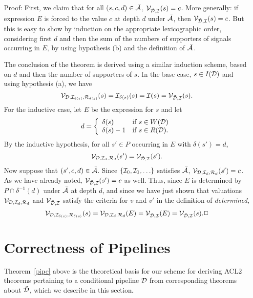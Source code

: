\documentclass{article}
\begin{document}
Proof: First, we claim that for all $(s,c,d) \in \bar{\cal A}$, ${\cal
V}_{\tilde{\cal D},{\cal I}}(s) = c$.  More generally: if expression
$E$ is forced to the value $c$ at depth $d$ under $\bar{\cal A}$, then
${\cal V}_{\tilde{\cal D},{\cal I}}(s) = c$.  But this is easy to show
by induction on the appropriate lexicographic order, considering first
$d$ and then the sum of the numbers of supporters of signals occurring
in $E$, by using hypothesis (b) and the definition of $\bar{\cal A}$.

The conclusion of the theorem is derived using a similar induction
scheme, based on $d$ and then the number of supporters of $s$.  In the
base case, $s \in I({\cal D})$ and using hypothesis (a), we have
\[{\cal V}_{{\cal D},{\cal I}_{\delta(s)},{\cal R}_{\delta(s)}}(s)
= {\cal I}_{\delta(s)}(s)
= {\cal I}(s)
= {\cal V}_{\tilde{\cal D},{\cal I}}(s).\]
For the inductive case, let $E$ be the expression for $s$ and let
\[d = \left\{\begin{array}{ll}
         \delta(s) & \mbox{if $s \in W({\cal D})$}\\
         \delta(s)-1 & \mbox{if $s \in R({\cal D})$}. \end{array} \right. \]
By the inductive hypothesis, for all $s' \in P$ occurring in $E$ with $\delta(s') = d$,
\[{\cal V}_{{\cal D},{\cal I}_d,{\cal R}_d}(s') = {\cal V}_{\tilde{\cal D},{\cal I}}(s').\]
Now suppose that $(s',c,d) \in \bar{\cal A}$.
Since $\{{\cal I}_0,{\cal I}_1,\ldots\}$ satisfies $\bar{\cal A}$, 
${\cal V}_{{\cal D},{\cal I}_d,{\cal R}_d}(s') = c$.  As we have already noted, 
${\cal V}_{\tilde{\cal D},{\cal I}}(s') = c$ as well.  Thus, since $E$ is determined
by $P \cap \delta^{-1}(d)$ under $\bar{\cal A}$ at depth $d$, and since we have
just shown that valuations ${\cal V}_{{\cal D},{\cal I}_d,{\cal R}_d}$ and ${\cal
V}_{\tilde{\cal D},{\cal I}}$ satisfy the criteria for $v$ and $v'$ in the
definition of {\it determined},
\[{\cal V}_{{\cal D},{\cal I}_{\delta(s)},{\cal R}_{\delta(s)}}(s)
= {\cal V}_{{\cal D},{\cal I}_d,{\cal R}_d}(E)
= {\cal V}_{\tilde{\cal D},{\cal I}}(E) = {\cal V}_{\tilde{\cal D},{\cal I}}(s). \Box\]


\section{Correctness of Pipelines}\label{correctness}

Theorem~\ref{pipe} above is the theoretical basis for our scheme for
deriving ACL2 theorems pertaining to a conditional pipeline ${\cal D}$
from corresponding theorems about $\tilde{\cal D}$, which we describe
in this section.
\end{document}
